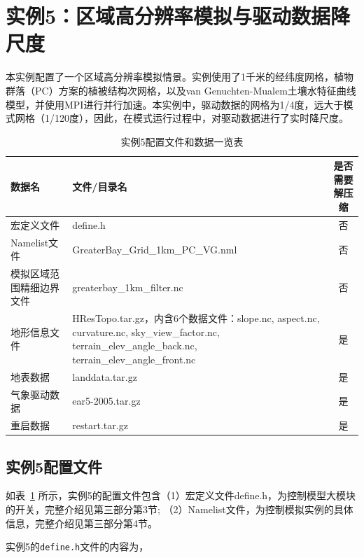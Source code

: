 \section{实例5：区域高分辨率模拟与驱动数据降尺度}

本实例配置了一个区域高分辨率模拟情景。实例使用了1千米的经纬度网格，植物群落（PC）方案的植被结构次网格，以及van Genuchten-Mualem土壤水特征曲线模型，并使用MPI进行并行加速。本实例中，驱动数据的网格为1/4度，远大于模式网格（1/120度），因此，在模式运行过程中，对驱动数据进行了实时降尺度。

\begin{table}[htbp]
\caption{实例5配置文件和数据一览表}
\centering \renewcommand{\arraystretch}{1.5}
\label{ex5table}
\begin{tabular}{lp{}c}
\toprule
\textbf{数据名} & \textbf{文件/目录名} & \textbf{是否需要解压缩} \\\midrule

宏定义文件 & define.h & 否 \\
Namelist文件 & GreaterBay\_Grid\_1km\_PC\_VG.nml & 否 \\
模拟区域范围精细边界文件 & greaterbay\_1km\_filter.nc & 否\\
地形信息文件 & HResTopo.tar.gz，内含6个数据文件：slope.nc, aspect.nc, curvature.nc, sky\_view\_factor.nc, terrain\_elev\_angle\_back.nc, terrain\_elev\_angle\_front.nc & 是 \\
地表数据 & landdata.tar.gz & 是 \\
气象驱动数据 & ear5-2005.tar.gz & 是 \\
重启数据 & restart.tar.gz & 是 \\

\bottomrule
\end{tabular}
\end{table}

\subsection{实例5配置文件} \label{ex5config}
如表~\ref{ex5table} 所示，实例5的配置文件包含（1）宏定义文件define.h，为控制模型大模块的开关，完整介绍见第三部分第3节; （2）Namelist文件，为控制模拟实例的具体信息，完整介绍见第三部分第4节。

实例5的\texttt{define.h}文件的内容为，


